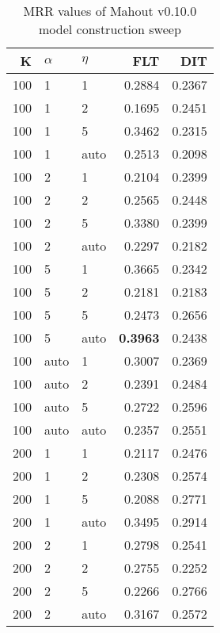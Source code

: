 
\begin{table}
\begin{spacing}{1.2}
\centering
\caption{MRR values of Mahout v0.10.0 model construction sweep}
\label{table:mahout_model_sweep}
\vspace{0.2em}
\parbox{.45\linewidth}{\centering \begin{tabular}{rll|rr}
\toprule
   K & $\alpha$ &   $\eta$ & FLT & DIT \\
\midrule
 100 &     1 &     1 &           0.2884 & 0.2367 \\
 100 &     1 &     2 &           0.1695 & 0.2451 \\
 100 &     1 &     5 &           0.3462 & 0.2315 \\
 100 &     1 &  auto &           0.2513 & 0.2098 \\
 100 &     2 &     1 &           0.2104 & 0.2399 \\
 100 &     2 &     2 &           0.2565 & 0.2448 \\
 100 &     2 &     5 &           0.3380 & 0.2399 \\
 100 &     2 &  auto &           0.2297 & 0.2182 \\
 100 &     5 &     1 &           0.3665 & 0.2342 \\
 100 &     5 &     2 &           0.2181 & 0.2183 \\
 100 &     5 &     5 &           0.2473 & 0.2656 \\
 100 &     5 &  auto &     {\bf 0.3963} & 0.2438 \\
 100 &  auto &     1 &           0.3007 & 0.2369 \\
 100 &  auto &     2 &           0.2391 & 0.2484 \\
 100 &  auto &     5 &           0.2722 & 0.2596 \\
 100 &  auto &  auto &           0.2357 & 0.2551 \\
 200 &     1 &     1 &           0.2117 & 0.2476 \\
 200 &     1 &     2 &           0.2308 & 0.2574 \\
 200 &     1 &     5 &           0.2088 & 0.2771 \\
 200 &     1 &  auto &           0.3495 & 0.2914 \\
 200 &     2 &     1 &           0.2798 & 0.2541 \\
 200 &     2 &     2 &           0.2755 & 0.2252 \\
 200 &     2 &     5 &           0.2266 & 0.2766 \\
 200 &     2 &  auto &           0.3167 & 0.2572 \\

\end{tabular}}
\end{spacing}
\end{table}
